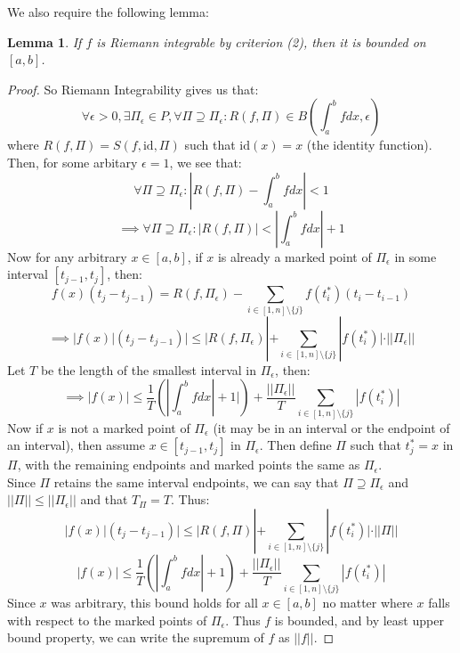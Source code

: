 \documentclass[10pt,letterpaper]{article} %
\newtheorem{lem}{Lemma}[section]
\begin{document}
We also require the following lemma:
\begin{lem}
If $f$ is Riemann integrable by criterion (2), then it is bounded on $[a, b]$. 
\end{lem}
\begin{proof}
So Riemann Integrability gives us that:
\begin{equation*}
\forall \epsilon > 0, \exists \Pi_\epsilon \in P, \forall \Pi \supseteq \Pi_\epsilon: R(f, \Pi) \in B\left(\int_{a}^{b}fdx, \epsilon\right)
\end{equation*}
where $R(f, \Pi) = S(f, \text{id}, \Pi)$ such that $\text{id}(x) = x$ (the identity function). Then, for some arbitary $\epsilon = 1$, we see that:
\begin{equation*}
\forall \Pi \supseteq \Pi_\epsilon: \left|R(f, \Pi) - \int_{a}^{b}fdx\right| < 1
\end{equation*}
\begin{equation*}
\implies \forall \Pi \supseteq \Pi_\epsilon: |R(f, \Pi)| < \left|\int_{a}^{b}fdx\right| + 1
\end{equation*}
Now for any arbitrary $x \in [a, b]$, if $x$ is already a marked point of $\Pi_\epsilon$ in some interval $[t_{j-1}, t_j]$, then:
\begin{equation*}
f(x)(t_j - t_{j-1}) = R(f, \Pi_\epsilon) - \sum_{i \in [1, n]\setminus\{j\}}f(t_i^*)(t_i - t_{i-1})
\end{equation*}
\begin{equation*}
\implies |f(x)|(t_j - t_{j-1})| \leqslant |R(f, \Pi_\epsilon)| + \sum_{i \in [1, n]\setminus\{j\}}|f(t_i^*)| \cdot ||\Pi_\epsilon||
\end{equation*}
Let $T$ be the length of the smallest interval in $\Pi_\epsilon$, then:
\begin{equation*}
\implies |f(x)| \leqslant \frac{1}{T}\left(\left|\int_{a}^{b}fdx\right| + 1|\right) + \frac{||\Pi_\epsilon||}{T}\sum_{i\in [1, n]\setminus\{j\}}|f(t_i^*)|
\end{equation*}
Now if $x$ is not a marked point of $\Pi_\epsilon$ (it may be in an interval or the endpoint of an interval), then assume $x \in [t_{j-1}, t_j]$ in $\Pi_\epsilon$. Then define $\Pi$ such that $t_j^* = x$ in $\Pi$, with the remaining endpoints and marked points the same as $\Pi_\epsilon$.\\

Since $\Pi$ retains the same interval endpoints, we can say that $\Pi \supseteq \Pi_\epsilon$ and $||\Pi|| \leqslant ||\Pi_\epsilon||$ and that $T_\Pi = T$. Thus:
\begin{equation*}
|f(x)|(t_j - t_{j-1})| \leqslant |R(f, \Pi)| + \sum_{i \in [1, n]\setminus\{j\}}|f(t_i^*)| \cdot ||\Pi|| 
\end{equation*}
\begin{equation*}
|f(x)| \leqslant \frac{1}{T}\left(\left|\int_{a}^{b}fdx\right| + 1\right) + \frac{||\Pi_\epsilon||}{T}\sum_{i \in [1, n]\setminus\{j\}}|f(t_i^*)|
\end{equation*}
Since $x$ was arbitrary, this bound holds for all $x \in [a, b]$ no matter where $x$ falls with respect to the marked points of $\Pi_\epsilon$. Thus $f$ is bounded, and by least upper bound property, we can write the supremum of $f$ as $||f||$. 
\end{proof}
\end{document}
